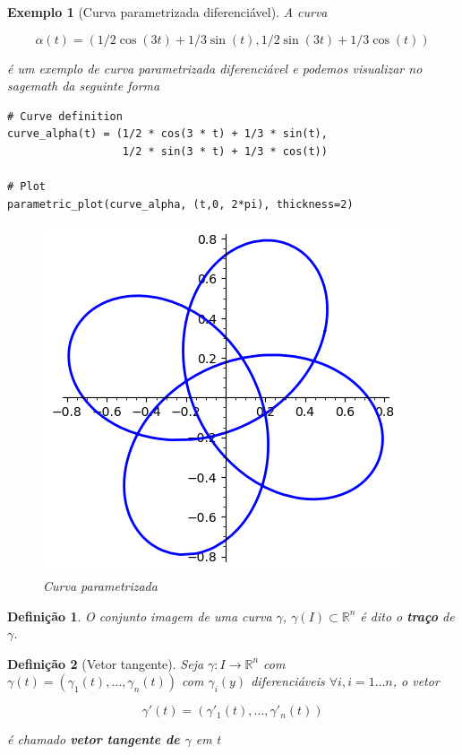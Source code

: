 \documentclass[12pt]{article}
\newtheorem{ex}{Exemplo}[section]
\newtheorem{definition}{Definição}
\begin{document}
\begin{ex}[Curva parametrizada diferenciável] A curva 

$$\alpha(t) = (1/2 \cos(3 t) + 1/3 \sin(t), 1/2 \sin(3 t) + 1/3 \cos(t))$$ 

é um exemplo de curva parametrizada diferenciável e podemos visualizar no \textit{sagemath} da seguinte forma
\begin{lstlisting}
# Curve definition
curve_alpha(t) = (1/2 * cos(3 * t) + 1/3 * sin(t), 
                  1/2 * sin(3 * t) + 1/3 * cos(t))

# Plot
parametric_plot(curve_alpha, (t,0, 2*pi), thickness=2)
\end{lstlisting}

\begin{figure}[H]
    \centering
    \includegraphics[scale=.6]{Images/ex1.1.png}
    \caption{Curva parametrizada}
    \label{fig:ex1.1}
\end{figure}
\end{ex}

\begin{definition}
O conjunto imagem de uma curva $\gamma$, $\gamma(I) \subset \mathbb{R}^n$ é dito o \textbf{traço} de $\gamma$.
\end{definition}

\begin{definition}[Vetor tangente]
Seja $\gamma: I \rightarrow \mathbb{R}^n$ com $\gamma(t) = (\gamma_1 (t), \ldots, \gamma_n (t))$ com $\gamma_i (y)$ diferenciáveis $\forall i, i = 1 \ldots n$, o vetor

$$\gamma'(t) = (\gamma'_1 (t), \ldots, \gamma'_n (t))$$

é chamado \textbf{vetor tangente de $\gamma$} em t
\end{definition}
\end{document}
